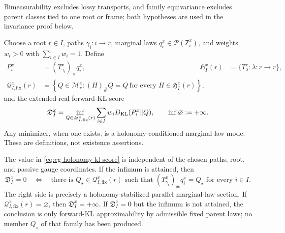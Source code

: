 Bimeasurability excludes lossy transports, and family equivariance excludes
parent classes tied to one root or frame; both hypotheses are used in the
invariance proof below. 

Choose a root \(r\in I\), paths \(\gamma_i:i\to r\), marginal laws
\(q_i^x\in\mathcal P(\mathsf Z_i^x)\), and weights \(w_i>0\) with
\(\sum_{i\in I}w_i=1\). Define
\begin{align}
P_i^x&=(T^x_{\gamma_i})_\#q_i^x,
&
\mathfrak H_I^x(r)
&=\{T^x_\lambda:\lambda:r\to r\},
\label{eq:cg-transported-law-holonomy}\\
\mathscr Q_{I,\mathrm{fix}}^x(r)
&=\left\{Q\in\mathscr M_r^x:
(H)_\#Q=Q\ \text{for every }H\in\mathfrak H_I^x(r)\right\},
\label{eq:cg-holonomy-fixed-parent}
\end{align}
and the extended-real forward-KL score
\begin{equation}
\mathfrak D_I^x
=\inf_{Q\in\mathscr Q_{I,\mathrm{fix}}^x(r)}
\sum_{i\in I}w_iD_{\mathrm{KL}}(P_i^x\Vert Q),
\qquad \inf\varnothing:=+\infty.
\label{eq:cg-holonomy-kl-score}
\end{equation}
Any minimizer, when one exists, is a holonomy-conditioned marginal-law
mode. These are definitions, not existence assertions. 

The value in \eqref{eq:cg-holonomy-kl-score} is independent of the chosen
paths, root, and passive gauge coordinates. If the infimum is attained, then
\begin{equation}
\mathfrak D_I^x=0
\quad\Longleftrightarrow\quad
\text{there is }Q_\star\in\mathscr Q_{I,\mathrm{fix}}^x(r)
\text{ such that }(T^x_{\gamma_i})_\#q_i^x=Q_\star
\text{ for every }i\in I.
\label{eq:cg-holonomy-parallel-law-section}
\end{equation}
The right side is precisely a holonomy-stabilized parallel marginal-law
section. If \(\mathscr Q_{I,\mathrm{fix}}^x(r)=\varnothing\), then
\(\mathfrak D_I^x=+\infty\). If \(\mathfrak D_I^x=0\) but the infimum is not
attained, the conclusion is only forward-KL approximability by admissible
fixed parent laws; no member \(Q_\star\) of that family has been produced.


